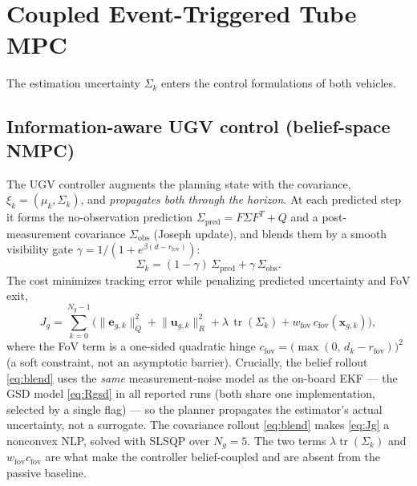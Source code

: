 \documentclass[letterpaper, 10 pt, conference]{ieeeconf}  %
\DeclareMathOperator{\tr}{tr}
\begin{document}
\section{Coupled Event-Triggered Tube MPC}
\label{sec:method}

The estimation uncertainty $\Sigma_k$ enters the control formulations of both
vehicles.

\subsection{Information-aware UGV control (belief-space NMPC)}
The UGV controller augments the planning state with the covariance,
$\xi_k=(\mu_k,\Sigma_k)$, and \emph{propagates both through the horizon}. At each
predicted step it forms the no-observation prediction
$\Sigma_{\mathrm{pred}}=F\Sigma F^T+Q$ and a post-measurement covariance
$\Sigma_{\mathrm{obs}}$ (Joseph update), and blends
them by a smooth visibility gate
$\gamma=1/(1+e^{\beta(d-r_{\mathrm{fov}})})$:
\begin{equation}
\Sigma_k = (1-\gamma)\,\Sigma_{\mathrm{pred}} + \gamma\,\Sigma_{\mathrm{obs}}.
\label{eq:blend}
\end{equation}
The cost minimizes tracking error while penalizing predicted uncertainty and FoV
exit,
\begin{equation}
J_g = \sum_{k=0}^{N_g-1}\!\Big(
\lVert\mathbf{e}_{g,k}\rVert_Q^2
+\lVert\mathbf{u}_{g,k}\rVert_R^2
+\lambda\,\tr(\Sigma_k)
+ w_{\mathrm{fov}}\,c_{\mathrm{fov}}(\mathbf{x}_{g,k})\Big),
\label{eq:Jg}
\end{equation}
where the FoV term is a one-sided quadratic hinge
$c_{\mathrm{fov}}=\big(\max(0,\,d_k-r_{\mathrm{fov}})\big)^2$ (a soft constraint,
not an asymptotic barrier). Crucially, the belief rollout \eqref{eq:blend} uses the
\emph{same} measurement-noise model as the on-board EKF --- the GSD model \eqref{eq:Rgsd} in
all reported runs (both share one implementation, selected by a single flag) --- so the planner
propagates the estimator's actual uncertainty, not a surrogate. The covariance rollout
\eqref{eq:blend} makes \eqref{eq:Jg} a nonconvex NLP, solved with SLSQP over $N_g=5$. The two
terms $\lambda\tr(\Sigma_k)$ and $w_{\mathrm{fov}}c_{\mathrm{fov}}$ are what make the
controller belief-coupled and are absent from the passive baseline.
\end{document}

